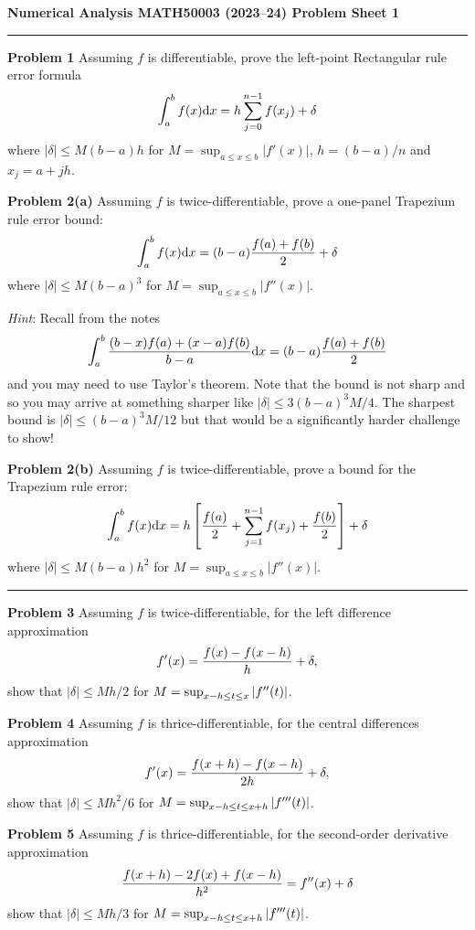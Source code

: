 \documentclass[12pt,a4paper]{article}
\def\endash{–}
\begin{document}
\textbf{Numerical Analysis MATH50003 (2023\ensuremath{\endash}24) Problem Sheet 1}

\rule{\textwidth}{1pt}
\textbf{Problem 1} Assuming $f$ is differentiable, prove the left-point Rectangular rule error formula
\[
\ensuremath{\int}_a^b f(x) {\rm d}x =  h \ensuremath{\sum}_{j=0}^{n-1} f(x_j) +  \ensuremath{\delta}
\]
where $|\ensuremath{\delta}| \ensuremath{\leq} M (b-a) h$ for $M = \sup_{a \ensuremath{\leq} x \ensuremath{\leq} b}|f'(x)|$, $h = (b-a)/n$ and $x_j = a + jh$.

\textbf{Problem 2(a)}  Assuming $f$ is twice-differentiable, prove a one-panel Trapezium rule error bound:
\[
\ensuremath{\int}_a^b f(x) {\rm d}x = (b-a) {f(a) + f(b) \over 2} +  \ensuremath{\delta}
\]
where $|\ensuremath{\delta}| \ensuremath{\leq} M (b-a)^3$ for $M = \sup_{a \ensuremath{\leq} x \ensuremath{\leq} b}|f''(x)|$.

\emph{Hint}: Recall from the notes
\[
\int_a^b {(b-x) f(a) + (x-a) f(b) \over b-a} {\rm d} x = (b-a) {f(a) + f(b) \over 2}
\]
and you may need to use Taylor's theorem. Note that the bound is not sharp and so you may arrive at something sharper like $|\ensuremath{\delta}| \ensuremath{\leq} 3(b-a)^3 M/4$. The sharpest bound is $|\ensuremath{\delta}| \ensuremath{\leq} (b-a)^3 M/12$ but that would be a significantly harder challenge to show!

\textbf{Problem 2(b)} Assuming $f$ is twice-differentiable, prove a bound for the Trapezium rule error:
\[
\ensuremath{\int}_a^b f(x) {\rm d}x = h \br[{f(a) \over 2} + \ensuremath{\sum}_{j=1}^{n-1} f(x_j) + {f(b) \over 2}] +  \ensuremath{\delta}
\]
where $|\ensuremath{\delta}| \ensuremath{\leq} M (b-a) h^2$ for $M = \sup_{a \ensuremath{\leq} x \ensuremath{\leq} b}|f''(x)|$.

\rule{\textwidth}{1pt}
\textbf{Problem 3} Assuming $f$ is twice-differentiable, for the left difference approximation
\[
f'(x) = {f(x) - f(x - h) \over h} + \ensuremath{\delta},
\]
show that $|\ensuremath{\delta}| \ensuremath{\leq} Mh/2$ for $M = \sup_{x-h \leq t \leq x}\left|{f''(t)}\right|$.

\textbf{Problem 4} Assuming $f$ is thrice-differentiable, for the central differences approximation
\[
f'(x) = {f(x + h) - f(x - h) \over 2h} + \ensuremath{\delta},
\]
show that $|\ensuremath{\delta}| \ensuremath{\leq} Mh^2/6$ for $M = \sup_{x-h \leq t \leq x+h}\left|{f'''(t)}\right|$.

\textbf{Problem 5}  Assuming $f$ is thrice-differentiable, for the second-order derivative approximation
\[
{f(x+h) - 2f(x) + f(x-h) \over h^2} = f''(x) + \ensuremath{\delta}
\]
show that $|\ensuremath{\delta}| \ensuremath{\leq} Mh/3$ for $M = \sup_{x-h \leq t \leq x+h}\left|{f'''(t)}\right|$.
\end{document}
